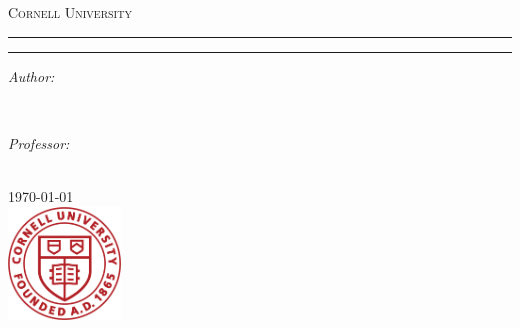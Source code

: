 \begin{titlepage}
  \newcommand{\HRule}{\rule{\linewidth}{0.5mm}}

  \center

  \textsc{\LARGE Cornell University} \vspace{1.5cm}
  \textsc{\Large \CouseCode} \vspace{0.5cm}
  \textsc{\large \CouseName} \vspace{0.5cm}

  \HRule \vspace{0.40cm}
  { \huge \bfseries \Title} \vspace{0.40cm}
  \HRule \vspace{1.5cm}

  \begin{minipage}{0.45\textwidth}
  \begin{flushleft} \large
  \emph{Author:}\\ \CoverAuthor
  \end{flushleft}
  \end{minipage}
  ~
  \begin{minipage}{0.45\textwidth}
  \begin{flushright} \large
  \emph{Professor:} \\
  \ProfessorName
  \end{flushright}
  \end{minipage}\\[4cm]

  {\large \today}\\[3cm]

  \includegraphics[width=3cm]{images/cu.png}\\[1cm]
   
  \vfill

\end{titlepage}
